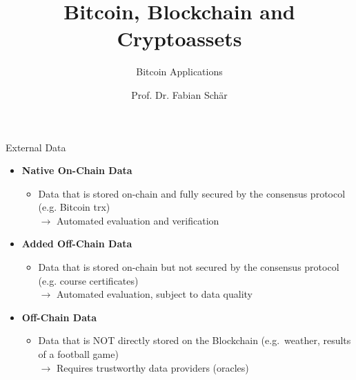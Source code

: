 \documentclass[handout]{beamer}
\title{Bitcoin, Blockchain and Cryptoassets}
\subtitle{Bitcoin Applications}
\author{Prof. Dr. Fabian Schär}
\institute{University of Basel}
\begin{document}
\thispagestyle{empty}
\begin{frame}[noframenumbering]
	\titlepage
\end{frame}


\begin{frame}{External Data}	
	\begin{itemize}
		\item<1 ->\textbf{Native On-Chain Data}
		\begin{itemize}
			\item<1 ->Data that is stored on-chain and fully secured by the consensus protocol (e.g. Bitcoin trx)\\
			\vspace{0.25em}$\rightarrow$ Automated evaluation and verification
		\end{itemize}
		\vspace{1em}
		\item<2 ->\textbf{Added Off-Chain Data}
		\begin{itemize}
			\item<2 -> Data that is stored on-chain but not secured by the consensus protocol (e.g. course certificates)\\
			\vspace{0.25em}$\rightarrow$ Automated evaluation, subject to data quality
		\end{itemize}
		\vspace{1em}
		\item<3 -> \textbf{Off-Chain Data}
		\begin{itemize}
			\item<3 -> Data that is NOT directly stored on the Blockchain (e.g.~weather, results of a football game)\\
			\vspace{0.25em}$\rightarrow$ Requires trustworthy data providers (oracles)
		\end{itemize}
	\end{itemize}
\end{frame}

\end{document}
